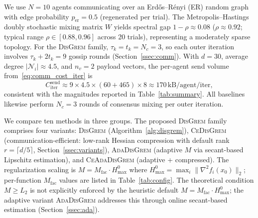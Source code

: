 \documentclass[review,onefignum,onetabnum]{siamart171218}
\begin{document}
	We use $N{=}10$ agents communicating over an Erd\H{o}s--R\'{e}nyi (ER) random graph
	with edge probability $p_{\mathrm{er}}{=}0.5$ (regenerated per trial).
	The Metropolis--Hastings doubly stochastic mixing matrix $W$ yields
	spectral gap $1{-}\rho\approx 0.08$
	($\rho\approx 0.92$; typical range $\rho\in[0.88,0.96]$ across 20 trials),
	representing a moderately sparse topology.
	For the \textsc{DisGrem} family, $\tau_k{=}t_k{=}N_c{=}3$,
	so each outer iteration involves $\tau_k{+}2t_k=9$ gossip rounds
	(Section~\ref{ssec:comm}).
	With $d{=}30$, average degree $|\mathcal N_i|\approx 4.5$, and $n_v=2$
	payload vectors, the per-agent send volume from~\eqref{eq:comm_cost_iter} is
	\[
	C_{\mathrm{iter}}^{\mathrm{send}}\!\approx\!
	9\!\times\! 4.5\!\times\!(60\!+\!465)\!\times\! 8
	\!\approx\! 170\,\text{kB/agent/iter},
	\]
	consistent with the magnitudes reported in Table~\ref{tab:summary}.
	All baselines likewise perform $N_c{=}3$ rounds of consensus
	mixing per outer iteration.
	
	We compare ten methods in three groups.
	The proposed \textsc{DisGrem} family comprises four variants:
	\textsc{DisGrem} (Algorithm~\ref{alg:disgrem}),
	\textsc{CeDisGrem} (communication-efficient: low-rank Hessian compression
	with default rank $r{=}\lceil d/5\rceil$, Section~\ref{ssec:variants}),
	\textsc{AdaDisGrem} (adaptive $M$ via secant-based Lipschitz estimation),
	and \textsc{CeAdaDisGrem} (adaptive + compressed).
	The regularization scaling is $M = M_{\mathrm{fac}}\cdot H_{\max}^{0}$ where
	$H_{\max}^{0} = \max_i \|\nabla^2 f_i(x_0)\|_2$;
	per-function $M_{\mathrm{fac}}$ values are listed in Table~\ref{tab:config}.
	The theoretical condition $M\ge L_2$ is not explicitly
	enforced by the heuristic default $M=M_{\mathrm{fac}}\cdot H_{\max}^0$;
	the adaptive variant \textsc{AdaDisGrem} addresses this through
	online secant-based estimation (Section~\ref{ssec:ada}).
	
\end{document}
